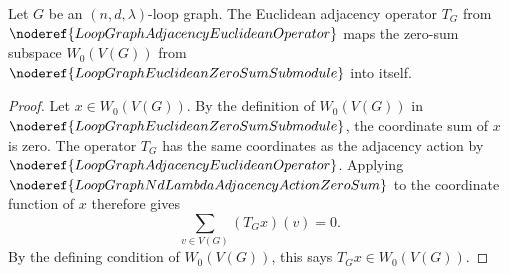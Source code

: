 \begin{helper}
Let \(G\) be an \((n,d,\lambda)\)-loop graph.  The Euclidean adjacency operator
\(T_G\) from \(\noderef{LoopGraphAdjacencyEuclideanOperator}\) maps the
zero-sum subspace \(W_0(V(G))\) from \(\noderef{LoopGraphEuclideanZeroSumSubmodule}\)
into itself.
\end{helper}
\begin{proof}
Let \(x\in W_0(V(G))\).  By the definition of \(W_0(V(G))\) in
\(\noderef{LoopGraphEuclideanZeroSumSubmodule}\), the coordinate sum of \(x\)
is zero.  The operator \(T_G\) has the same coordinates as the adjacency action
by \(\noderef{LoopGraphAdjacencyEuclideanOperator}\).  Applying
\(\noderef{LoopGraphNdLambdaAdjacencyActionZeroSum}\) to the coordinate function
of \(x\) therefore gives
\[
  \sum_{v\in V(G)} (T_Gx)(v)=0.
\]
By the defining condition of \(W_0(V(G))\), this says \(T_Gx\in W_0(V(G))\).
\end{proof}

